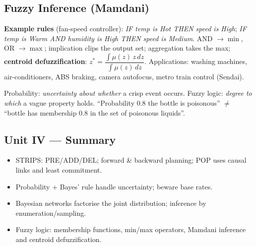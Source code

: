 \subsection{Fuzzy Inference (Mamdani)}
\begin{center}
\end{center}
\textbf{Example rules} (fan-speed controller): \emph{IF temp is Hot THEN speed is High}; \emph{IF temp is Warm AND humidity is High THEN speed is Medium}. AND $\to\min$, OR $\to\max$; implication clips the output set; aggregation takes the max; \textbf{centroid defuzzification}: $z^{*}=\dfrac{\int\mu(z)\,z\,dz}{\int\mu(z)\,dz}$. Applications: washing machines, air-conditioners, ABS braking, camera autofocus, metro train control (Sendai).

\begin{keypoint}
Probability: \emph{uncertainty about whether} a crisp event occurs. Fuzzy logic: \emph{degree to which} a vague property holds. ``Probability 0.8 the bottle is poisonous'' $\ne$ ``bottle has membership 0.8 in the set of poisonous liquids''.
\end{keypoint}

\subsection*{Unit IV --- Summary}
\begin{itemize}
\item STRIPS: PRE/ADD/DEL; forward \& backward planning; POP uses causal links and least commitment.
\item Probability + Bayes' rule handle uncertainty; beware base rates.
\item Bayesian networks factorise the joint distribution; inference by enumeration/sampling.
\item Fuzzy logic: membership functions, min/max operators, Mamdani inference and centroid defuzzification.
\end{itemize}




